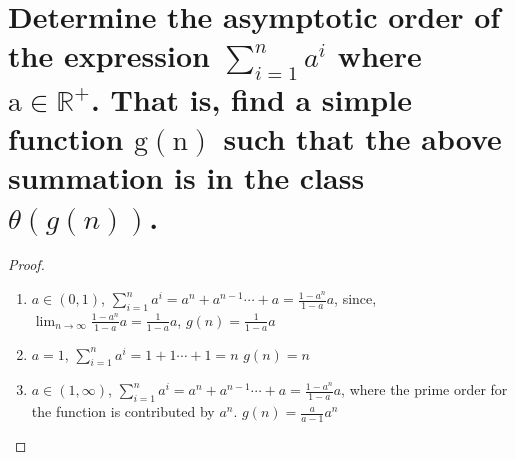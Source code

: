 \documentclass[a4paper]{article}
\begin{document}
\section{Determine the asymptotic order of the expression $\sum_{i=1}^n a^i$ where $\mathrm{a} \in \mathbb{R}^{+}$. That is, find a simple function $\mathrm{g}(\mathrm{n})$ such that the above summation is in the class $\theta(g(n))$.}

\begin{proof}
  \begin{enumerate}
    \item $a\in (0,1)$, $\sum_{i=1}^n a^i = a^n+a^{n-1}\cdots +a=\frac{1-a^n}{1-a} a$, since, $\lim _{n \rightarrow \infty}\frac{1-a^n}{1-a} a=\frac{1}{1-a}a$, $g(n)=\frac{1}{1-a}a$
    \item $a=1$, $\sum_{i=1}^n a^i = 1+1\cdots+1=n$ $g(n)=n$
    \item $a\in (1,\infty)$, $\sum_{i=1}^n a^i = a^n+a^{n-1}\cdots +a= \frac{1-a^n}{1-a} a$, where the prime order for the function is contributed by $a^n$. $g(n)=\frac{a}{a-1}a^{n}$
    
  \end{enumerate}
  \end{proof}
\end{document}
